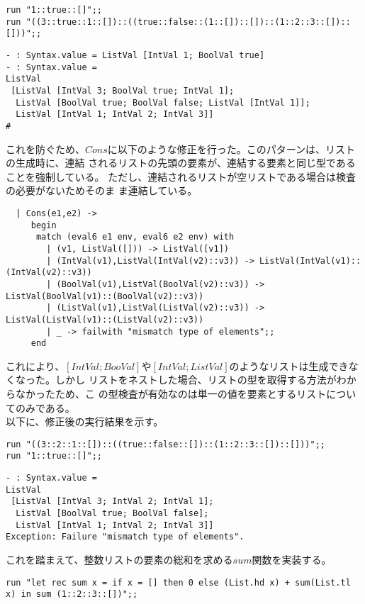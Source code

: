 \documentclass[a4paper,9pt]{jsarticle}
\begin{document}
\begin{lstlisting}
run "1::true::[]";;
run "((3::true::1::[])::((true::false::(1::[])::[])::(1::2::3::[])::[]))";;
\end{lstlisting}
\begin{lstlisting}
- : Syntax.value = ListVal [IntVal 1; BoolVal true]
- : Syntax.value =
ListVal
 [ListVal [IntVal 3; BoolVal true; IntVal 1];
  ListVal [BoolVal true; BoolVal false; ListVal [IntVal 1]];
  ListVal [IntVal 1; IntVal 2; IntVal 3]]
# 
\end{lstlisting}

これを防ぐため、$Cons$に以下のような修正を行った。このパターンは、リストの生成時に、連結
されるリストの先頭の要素が、連結する要素と同じ型であることを強制している。
ただし、連結されるリストが空リストである場合は検査の必要がないためそのま
ま連結している。

\begin{lstlisting}
  | Cons(e1,e2) ->
     begin
      match (eval6 e1 env, eval6 e2 env) with
        | (v1, ListVal([])) -> ListVal([v1])
        | (IntVal(v1),ListVal(IntVal(v2)::v3)) -> ListVal(IntVal(v1)::(IntVal(v2)::v3))
        | (BoolVal(v1),ListVal(BoolVal(v2)::v3)) -> ListVal(BoolVal(v1)::(BoolVal(v2)::v3))
        | (ListVal(v1),ListVal(ListVal(v2)::v3)) -> ListVal(ListVal(v1)::(ListVal(v2)::v3))
        | _ -> failwith "mismatch type of elements";;
     end
\end{lstlisting}
これにより、$[IntVal;BooVal]$や$[IntVal;ListVal]$のようなリストは生成できなくなった。しかし
リストをネストした場合、リストの型を取得する方法がわからなかったため、こ
の型検査が有効なのは単一の値を要素とするリストについてのみである。\\

以下に、修正後の実行結果を示す。

\begin{lstlisting}
run "((3::2::1::[])::((true::false::[])::(1::2::3::[])::[]))";;
run "1::true::[]";;
\end{lstlisting}

\begin{lstlisting}
- : Syntax.value =
ListVal
 [ListVal [IntVal 3; IntVal 2; IntVal 1];
  ListVal [BoolVal true; BoolVal false];
  ListVal [IntVal 1; IntVal 2; IntVal 3]]
Exception: Failure "mismatch type of elements".
\end{lstlisting}

これを踏まえて、整数リストの要素の総和を求める$sum$関数を実装する。

\begin{lstlisting}
run "let rec sum x = if x = [] then 0 else (List.hd x) + sum(List.tl x) in sum (1::2::3::[])";;
\end{lstlisting}
\end{document}
